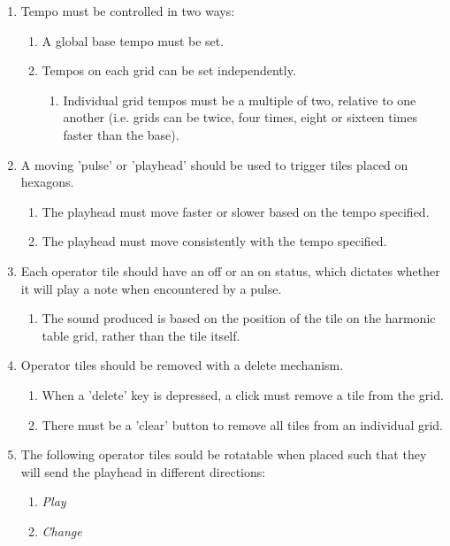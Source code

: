 \documentclass[10pt,a4paper]{article}
\begin{document}
\begin{enumerate}
\item Tempo must be controlled in two ways:
\begin{enumerate}
\item A global base tempo must be set.
\item Tempos on each grid can be set independently.
\begin{enumerate}
\item Individual grid tempos must be a multiple of two, relative to one another (i.e. grids can be twice, four times, eight or sixteen times faster than the base).
\end{enumerate}
\end{enumerate}

\item A moving 'pulse' or 'playhead' should be used to trigger tiles placed on hexagons.
\begin{enumerate}
\item The playhead must move faster or slower based on the tempo specified.
\item The playhead must move consistently with the tempo specified.
\end{enumerate}

\item Each operator tile should have an off or an on status, which dictates whether it will play a note when encountered by a pulse.
\begin{enumerate}
\item The sound produced is based on the position of the tile on the harmonic table grid, rather than the tile itself.
\end{enumerate}

\item Operator tiles should be removed with a delete mechanism.
\begin{enumerate}
\item When a 'delete' key is depressed, a click must remove a tile from the grid.
\item There must be a 'clear' button to remove all tiles from an individual grid.
\end{enumerate}

\item The following operator tiles sould be rotatable when placed such that they will send the playhead in different directions:
\begin{enumerate}
\item \textit{Play}
\item \textit{Change}
\end{enumerate}


\end{enumerate}
\end{document}
